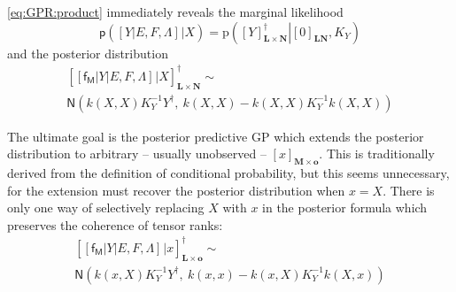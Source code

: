 \documentclass[preprint,12pt]{elsarticle}
\newcommand*{\M}[1]{\ensuremath{#1}\xspace}
\newcommand*{\x}{\times}
\newcommand*{\mi}[1]{\mathbf{#1}}
\newcommand*{\rv}[1]{\mathsf{#1}}
\newcommand*{\te}[2][]{\left\lbrack{#2}\right\rbrack_{#1}}
\newcommand*{\prob}[3]{\M{\mathrm{p}\!\left(\left.{#1}\right\vert{#2,#3}\right)}}
\newcommand*{\gauss}[2]{\mathsf{N}\!\left({#1,#2}\right)}
\begin{document}
        \cref{eq:GPR:product} immediately reveals the marginal likelihood
        \begin{equation} \label{eq:GPR:marginalLikelihood}
            \mathsf{p}\!\left(\te{Y \vert E,F,\Lambda} \big\vert X\right)
            = \prob{\te[\mi{L\x N}]{Y}^{\dagger}}{\te[\mi{LN}]{0}}{K_Y}
        \end{equation}
        and the posterior distribution
        \begin{multline*}
            \te[\mi{L\x N}]{\te{\rv{f_M} \vert Y \vert E,F,\Lambda} \big\vert X}^{\dagger} \sim \\
            \gauss{k(X,X) K_{Y}^{-1} Y^{\dagger}}{\ k(X,X) - k(X,X) K_{Y}^{-1} k(X,X)}
        \end{multline*}

        The ultimate goal is the posterior predictive GP which extends the posterior distribution to arbitrary -- usually unobserved -- $\te[\mi{M}\x\mi{o}]{x}$. This is traditionally derived from the definition of conditional probability, but this seems unnecessary, for the extension must recover the posterior distribution when $x=X$. There is only one way of selectively replacing $X$ with $x$ in the posterior formula which preserves the coherence of tensor ranks:
        \begin{multline} \label{def:GPR:Predictive}
            \te[\mi{L\x o}]{\te{\rv{f_M} \vert Y \vert E,F,\Lambda} \big\vert x}^{\dagger} \sim \\
            \gauss{k(x,X) K_{Y}^{-1} Y^{\dagger}}{\ k(x,x) - k(x,X) K_{Y}^{-1} k(X,x)}
        \end{multline}
\end{document}
